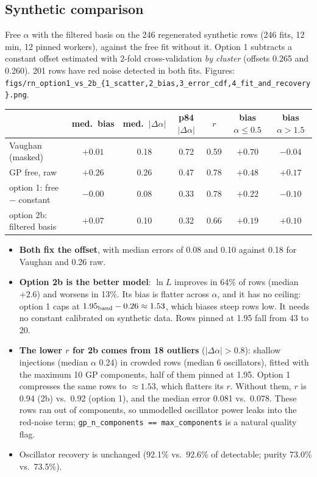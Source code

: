 \documentclass[11pt]{article}
\newcommand{\code}[1]{\texttt{#1}}
\begin{document}
\subsection{Synthetic comparison}

Free $\alpha$ with the filtered basis on the 246 regenerated synthetic rows (246 fits,
12\,min, 12 pinned workers), against the free fit without it. Option 1 subtracts a constant
offset estimated with 2-fold cross-validation \emph{by cluster} (offsets 0.265 and 0.260).
201 rows have red noise detected in both fits. Figures:
\code{figs/rn\_option1\_vs\_2b\_\{1\_scatter,2\_bias,3\_error\_cdf,4\_fit\_and\_recovery\}.png}.

\begin{center}
\begin{tabular}{lcccccc}
\toprule
 & med.\ bias & med.\ $|\Delta\alpha|$ & p84 $|\Delta\alpha|$ & $r$ & bias $\alpha\le0.5$ & bias $\alpha>1.5$ \\
\midrule
Vaughan (masked)              & $+0.01$ & 0.18 & 0.72 & 0.59 & $+0.70$ & $-0.04$ \\
GP free, raw                  & $+0.26$ & 0.26 & 0.47 & 0.78 & $+0.48$ & $+0.17$ \\
option 1: free $-$ constant   & $-0.00$ & 0.08 & 0.33 & 0.78 & $+0.22$ & $-0.10$ \\
option 2b: filtered basis     & $+0.07$ & 0.10 & 0.32 & 0.66 & $+0.19$ & $+0.10$ \\
\bottomrule
\end{tabular}
\end{center}

\begin{itemize}
\item \textbf{Both fix the offset}, with median errors of 0.08 and 0.10 against 0.18 for Vaughan
  and 0.26 raw.
\item \textbf{Option 2b is the better model}: $\ln L$ improves in 64\% of rows (median
  $+2.6$) and worsens in 13\%. Its bias is flatter across $\alpha$, and it has no ceiling:
  option 1 caps at $1.95_{\rm band}-0.26\approx1.53$, which biases steep rows low. It needs
  no constant calibrated on synthetic data. Rows pinned at 1.95 fall from 43 to 20.
\item \textbf{The lower $r$ for 2b comes from 18 outliers} ($|\Delta\alpha|>0.8$): shallow
  injections (median $\alpha$ 0.24) in crowded rows (median 6 oscillators), fitted with the
  maximum 10 GP components, half of them pinned at 1.95. Option 1 compresses the same rows to
  $\approx1.53$, which flatters its $r$. Without them, $r$ is 0.94 (2b) vs.\ 0.92 (option 1),
  and the median error 0.081 vs.\ 0.078. These rows ran out of components, so unmodelled
  oscillator power leaks into the red-noise term; \code{gp\_n\_components == max\_components}
  is a natural quality flag.
\item Oscillator recovery is unchanged (92.1\% vs.\ 92.6\% of detectable; purity 73.0\% vs.\ 73.5\%).
\end{itemize}
\end{document}
